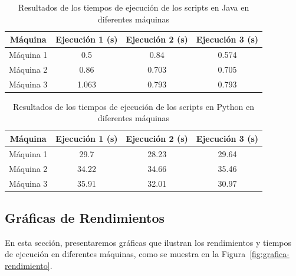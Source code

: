 \documentclass[conference]{IEEEtran}
\begin{document}
\begin{table}[ht]
\caption{Resultados de los tiempos de ejecución de los scripts en Java en diferentes máquinas}
\label{tab:resultados-java}
\centering
\begin{tabular}{c|S[table-format=2.3]S[table-format=2.3]S[table-format=2.3]}
\toprule
Máquina & {Ejecución 1 (s)} & {Ejecución 2 (s)} & {Ejecución 3 (s)} \\
\midrule
Máquina 1 & 0.5 & 0.84 & 0.574 \\
Máquina 2 & 0.86 & 0.703 & 0.705 \\
Máquina 3 & 1.063 & 0.793 & 0.793 \\
\bottomrule
\end{tabular}
\end{table}

\begin{table}[ht]
\caption{Resultados de los tiempos de ejecución de los scripts en Python en diferentes máquinas}
\label{tab:resultados-python}
\centering
\begin{tabular}{c|S[table-format=2.2]S[table-format=2.2]S[table-format=2.6]}
\toprule
Máquina & {Ejecución 1 (s)} & {Ejecución 2 (s)} & {Ejecución 3 (s)} \\
\midrule
Máquina 1 & 29.7 & 28.23 & 29.64 \\
Máquina 2 & 34.22 & 34.66 & 35.46 \\
Máquina 3 & 35.91 & 32.01 & 30.97 \\
\bottomrule
\end{tabular}
\end{table}

\subsection{Gráficas de Rendimientos}

En esta sección, presentaremos gráficas que ilustran los rendimientos y tiempos de ejecución en diferentes máquinas, como se muestra en la Figura~\ref{fig:grafica-rendimiento}.
\end{document}
